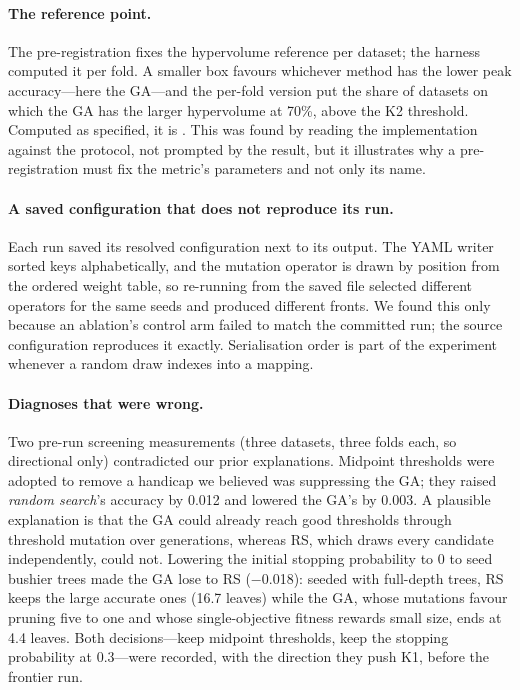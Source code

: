 \documentclass[sigconf,review,anonymous]{acmart}
\newcommand{\GA}{GA\xspace}
\newcommand{\RS}{RS\xspace}
\begin{document}
\paragraph{The reference point.} The pre-registration fixes the hypervolume reference per
dataset; the harness computed it per fold. A smaller box favours whichever method has
the lower peak accuracy---here the \GA---and the per-fold version put the share of
datasets on which the \GA has the larger hypervolume at 70\%, above the K2 threshold. Computed as specified, it is \KtwoRate. This was found
by reading the implementation against the protocol, not prompted by the result, but it
illustrates why a pre-registration must fix the metric's parameters and not only its
name.

\paragraph{A saved configuration that does not reproduce its run.} Each run saved its
resolved configuration next to its output. The YAML writer sorted keys alphabetically, and
the mutation operator is drawn by position from the ordered weight table, so re-running
from the saved file selected different operators for the same seeds and produced different
fronts. We found this only because an ablation's control arm failed to match the
committed run; the source configuration reproduces it exactly. Serialisation order is part
of the experiment whenever a random draw indexes into a mapping.

\paragraph{Diagnoses that were wrong.} Two pre-run screening measurements (three datasets,
three folds each, so directional only) contradicted our prior explanations. Midpoint
thresholds were adopted to remove a handicap we believed was suppressing the \GA; they
raised \emph{random search}'s accuracy by 0.012 and lowered the \GA's by 0.003. A
plausible explanation is that the \GA could already reach good thresholds through
threshold mutation over generations, whereas \RS, which draws every candidate
independently, could not.
Lowering the initial stopping probability to 0 to seed bushier trees made the \GA lose to
\RS{} ($-$0.018): seeded with full-depth trees, \RS{} keeps the large accurate ones
(16.7 leaves) while the \GA, whose mutations favour pruning five to one and whose
single-objective fitness rewards small size, ends at 4.4 leaves. Both
decisions---keep midpoint thresholds, keep the stopping probability at 0.3---were
recorded, with the direction they push K1, before the frontier run.
\end{document}
